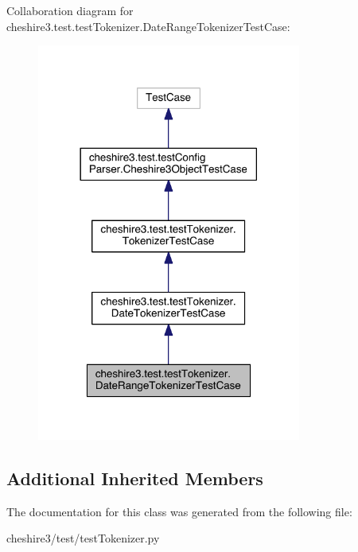 Collaboration diagram for cheshire3.\-test.\-test\-Tokenizer.\-Date\-Range\-Tokenizer\-Test\-Case\-:
\nopagebreak
\begin{figure}[H]
\begin{center}
\leavevmode
\includegraphics[width=246pt]{classcheshire3_1_1test_1_1test_tokenizer_1_1_date_range_tokenizer_test_case__coll__graph}
\end{center}
\end{figure}
\subsection*{Additional Inherited Members}


The documentation for this class was generated from the following file\-:\begin{DoxyCompactItemize}
\item 
cheshire3/test/test\-Tokenizer.\-py\end{DoxyCompactItemize}
